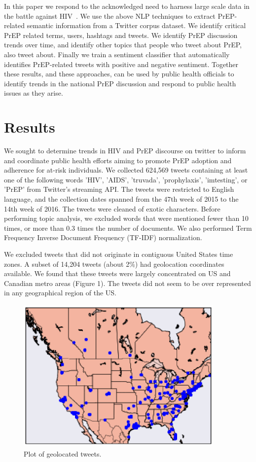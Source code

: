 \documentclass{sig-alternate-05-2015}
\begin{document}
In this paper we respond to the acknowledged need to harness large scale data in the battle against HIV~\cite{young2015big}. We use the above NLP techniques to extract PrEP-related semantic information from a Twitter corpus dataset. We identify critical PrEP related terms, users, hashtags and tweets. We identify PrEP discussion trends over time, and identify other topics that people who tweet about PrEP, also tweet about. Finally we train a sentiment classifier that automatically identifies PrEP-related tweets with positive and negative sentiment. Together these results, and these approaches, can be used by public health officials to identify trends in the national PrEP discussion and respond to public health issues as they arise.

\section{Results}
We sought to determine trends in HIV and PrEP discourse on twitter to inform and coordinate public health efforts aiming to promote PrEP adoption and adherence for at-risk individuals. We collected 624,569 tweets containing at least one of the following words 'HIV', 'AIDS', 'truvada', 'prophylaxis', 'imtesting', or 'PrEP' from Twitter's streaming API. The tweets were restricted to English language, and the collection dates spanned from the 47th week of 2015 to the 14th week of 2016. The tweets were cleaned of exotic characters. Before performing topic analysis, we excluded words that were mentioned fewer than 10 times, or more than 0.3 times the number of documents. We also performed Term Frequency Inverse Document Frequency (TF-IDF) normalization.

We excluded tweets that did not originate in contiguous United States time zones. A subset of 14,204 tweets (about 2\%) had geolocation coordinates available. We found that these tweets were largely concentrated on US and Canadian metro areas (Figure 1). The tweets did not seem to be over represented in any geographical region of the US.

\begin{figure}
\centering
\includegraphics[height=3in, width=4in]{map}
\caption{Plot of geolocated tweets.}
\end{figure}
\end{document}

